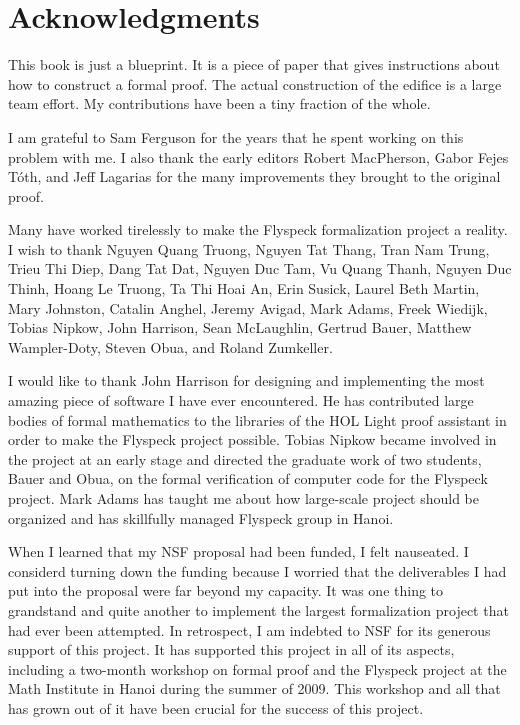 

\section*{Acknowledgments}

This book is just a blueprint.  It is a piece of paper that gives instructions
about how to construct a formal proof.  The actual construction of the edifice
is a large team effort.  My contributions have been a tiny fraction of the whole.

I am grateful to Sam Ferguson for the years that
he spent working on this problem with me.  I also thank the early editors
Robert MacPherson, Gabor Fejes T\'oth, and Jeff Lagarias for the many improvements
they brought to the original proof.

Many have worked tirelessly to make the Flyspeck formalization project
a reality.  I wish to thank Nguyen Quang
Truong, %
Nguyen Tat Thang, %
Tran Nam Trung, Trieu Thi Diep, Dang Tat Dat, Nguyen Duc Tam, Vu Quang
Thanh, Nguyen Duc Thinh, Hoang Le Truong, Ta Thi Hoai An, Erin Susick,
Laurel Beth Martin, Mary Johnston, Catalin Anghel, Jeremy Avigad,
Mark Adams, Freek Wiedijk, Tobias Nipkow, John Harrison, Sean
McLaughlin, Gertrud Bauer, Matthew Wampler-Doty, Steven Obua, and
Roland Zumkeller.

 I would like to thank John Harrison for designing and implementing the most amazing piece of
 software I have ever encountered.  He has contributed large bodies of formal mathematics to
the libraries of the HOL Light proof assistant in order to make the Flyspeck project
possible.   Tobias Nipkow became involved in the project at an early stage and
directed the graduate work of two students, Bauer and Obua, on the formal verification of computer
code for the Flyspeck project. Mark Adams has taught me about how
 large-scale project should be organized and has skillfully managed 
  Flyspeck group in Hanoi.

  When I learned that my NSF proposal had been funded, I felt
  nauseated.  I considerd turning down the
  funding because I worried that the  deliverables I had put
  into the proposal were far beyond my capacity.  It was one thing to
  grandstand and quite another to implement the largest
  formalization project that had ever been attempted.  In retrospect, I
  am indebted to NSF for its generous support of this project.  It has supported
  this project in all of its aspects, including a
  two-month  workshop on formal proof
  and the Flyspeck project  at the Math Institute in Hanoi during the summer of
  2009.  This workshop and all that has grown out of it have been crucial for
  the success of this project.

